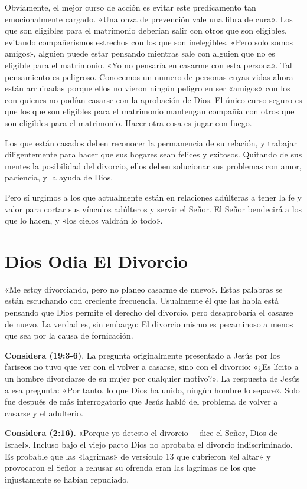 \documentclass[12pt, twoside, openright]{book}
\begin{document}
Obviamente, el mejor curso de acción es evitar este predicamento tan emocionalmente cargado. «Una onza de prevención vale una libra de cura». Los que son eligibles para el matrimonio deberían salir con otros que son eligibles, evitando compañerismos estrechos con los que son inelegibles. «Pero solo somos amigos», alguien puede estar pensando mientras sale con alguien que no es eligible para el matrimonio. «Yo no pensaría en casarme con esta persona». Tal pensamiento es peligroso. Conocemos un numero de personas cuyas vidas ahora están arruinadas porque ellos no vieron ningún peligro en ser «amigos» con los con quienes no podían casarse con la aprobación de Dios. El único curso seguro es que los que son eligibles para el matrimonio mantengan compañía con otros que son eligibles para el matrimonio. Hacer otra cosa es jugar con fuego.

Los que están casados deben reconocer la permanencia de su relación, y trabajar diligentemente para hacer que sus hogares sean felices y exitosos. Quitando de sus mentes la posibilidad del divorcio, ellos deben solucionar sus problemas con amor, paciencia, y la ayuda de Dios.

Pero sí urgimos a los que actualmente están en relaciones adúlteras a tener la fe y valor para cortar sus vínculos adúlteros y servir el Señor. El Señor bendecirá a los que lo hacen, y «los cielos valdrán lo todo». 

\section{Dios Odia El Divorcio}
«Me estoy divorciando, pero no planeo casarme de nuevo». Estas palabras se están escuchando con creciente frecuencia. Usualmente él que las habla está pensando que Dios permite el derecho del divorcio, pero desaprobaría el casarse de nuevo. La verdad es, sin embargo: El divorcio mismo es pecaminoso a menos que sea por la causa de fornicación. 

\textbf{Considera (19:3-6)}. La pregunta originalmente presentado a Jesús por los fariseos no tuvo que ver con el volver a casarse, sino con el divorcio: «¿Es lícito a un hombre divorciarse de su mujer por cualquier motivo?». La respuesta de Jesús a esa pregunta: «Por tanto, lo que Dios ha unido, ningún hombre lo separe». Solo fue después de más interrogatorio que Jesús habló del problema de volver a casarse y el adulterio.

\textbf{Considera (2:16)}. «Porque yo detesto el divorcio —dice el Señor, Dios de Israel». Incluso bajo el viejo pacto Dios no aprobaba el divorcio indiscriminado. Es probable que las «lagrimas» de versículo 13 que cubrieron «el altar» y provocaron el Señor a rehusar su ofrenda eran las lagrimas de los que injustamente se habían repudiado.
\end{document}
